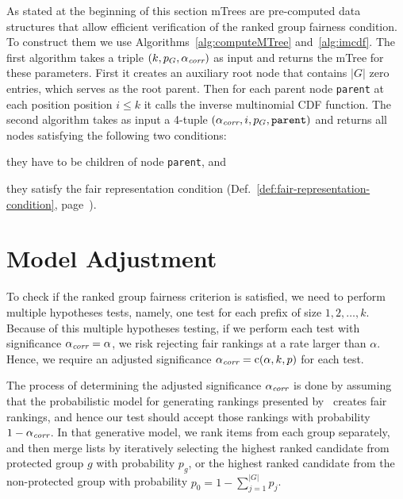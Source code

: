 

As stated at the beginning of this section mTrees are pre-computed data structures that allow efficient verification of the ranked group fairness condition.
%
To construct them we use Algorithms~\ref{alg:computeMTree} and~\ref{alg:imcdf}.
%
The first algorithm \algoComputeMTree takes a triple $(k,p_G,\alpha_\textit{corr})$ as input and returns the mTree for these parameters.
%
First it creates an auxiliary root node that contains $|G|$ zero entries, which serves as the root parent.
%
Then for each parent node \texttt{parent} at each position position $i \leq k$ it calls the inverse multinomial CDF function.
%
The second algorithm \algoImcdf takes as input a 4-tuple $(\alpha_\textit{corr}, i, p_G, \texttt{parent})$ and returns all nodes satisfying the following two conditions:
\begin{inparaenum}[(i.)]
	\item they have to be children of node \texttt{parent}, and
	\item they satisfy the fair representation condition (Def.~\ref{def:fair-representation-condition}, page~\pageref{def:fair-representation-condition}).
\end{inparaenum}

\section{Model Adjustment}
\label{sec:model-adjustment}

To check if the ranked group fairness criterion is satisfied, we need to perform multiple hypotheses tests, namely, one test for each prefix of size $1, 2, \dots, k$.
%
Because of this multiple hypotheses testing, if we perform each test with significance $\alpha_\textit{corr} = \alpha$, we risk rejecting fair rankings at a rate larger than $\alpha$.
%
Hence, we require an adjusted significance $\alpha_\textit{corr} = \operatorname{c}(\alpha, k, p)$ for each test.
%

The process of determining the adjusted significance $\alpha_\textit{corr}$ is done by assuming that the probabilistic model for generating rankings presented by~\citet{yang2016measuring} creates fair rankings, and hence our test should accept those rankings with probability $1 - \alpha_\textit{corr}$.
%
In that generative model, we rank items from each group separately, and then merge lists by iteratively selecting the highest ranked candidate from protected group $g$ with probability $p_g$, or the highest ranked candidate from the non-protected group with probability $p_0 = 1-\sum_{j=1}^{|G|} p_j$.
%


